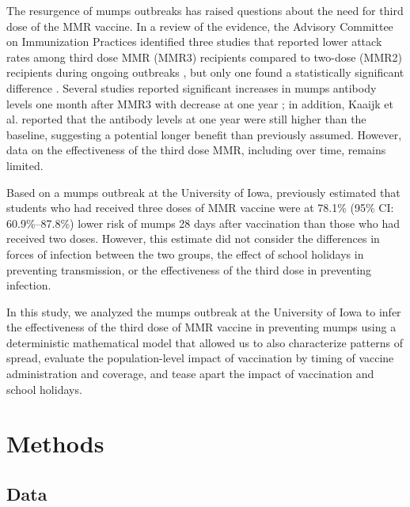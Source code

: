 \documentclass[12pt]{article}
\begin{document}
The resurgence of mumps outbreaks has raised questions about the need for third dose of the MMR vaccine.
In a review of the evidence, the Advisory Committee on Immunization Practices \citep{marin2018recommendation} identified three studies that reported lower attack rates among third dose MMR (MMR3) recipients compared to two-dose (MMR2) recipients during ongoing outbreaks \citep{ogbuanu2012impact,nelson2013epidemiology,cardemil2017effectiveness}, but only one found a statistically significant difference \citep{cardemil2017effectiveness}. 
Several studies reported significant increases in mumps antibody levels one month after MMR3 with decrease at one year \citep{fiebelkorn2014mumps,latner2017mumps,kaaijk2020third};
in addition, Kaaijk et al. reported that the antibody levels at one year were still higher than the baseline, suggesting a potential longer benefit than previously assumed. 
However, data on the effectiveness of the third dose MMR, including over time, remains limited.

Based on a mumps outbreak at the University of Iowa, \cite{cardemil2017effectiveness} previously estimated that students who had received three doses of MMR vaccine were at 78.1\% (95\% CI: 60.9\%--87.8\%) lower risk of mumps 28 days after vaccination than those who had received two doses.
However, this estimate did not consider the differences in forces of infection between the two groups, the effect of school holidays in preventing transmission, or the effectiveness of the third dose in preventing infection. 

In this study, we analyzed the mumps outbreak at the University of Iowa to infer the effectiveness of the third dose of MMR vaccine in preventing mumps using a deterministic mathematical model that allowed us to also characterize patterns of spread, evaluate the population-level impact of vaccination by timing of vaccine administration and coverage, and tease apart the impact of vaccination and school holidays.

\section{Methods}

\subsection{Data}
\end{document}
